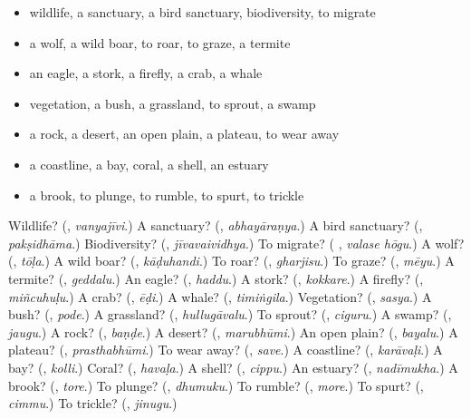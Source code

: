 \begin{itemize}
\raggedright
  \item wildlife, a sanctuary, a bird sanctuary, biodiversity, to migrate
  \item a wolf, a wild boar, to roar, to graze, a termite
  \item an eagle, a stork, a firefly, a crab, a whale
  \item vegetation, a bush, a grassland, to sprout, a swamp
  \item a rock, a desert, an open plain, a plateau, to wear away
  \item a coastline, a bay, coral, a shell, an estuary
  \item a brook, to plunge, to rumble, to spurt, to trickle
\end{itemize}

\begin{tcolorbox}[breakable,colback=teal!4,colframe=teal!35!black,title={Before you move on}]
Wildlife? (\textbf{}, \emph{vanyajīvi}.) A sanctuary? (\textbf{}, \emph{abhayāraṇya}.) A bird sanctuary? (\textbf{}, \emph{pakṣidhāma}.) Biodiversity? (\textbf{}, \emph{jīvavaividhya}.) To migrate? (\textbf{ }, \emph{valase hōgu}.) A wolf? (\textbf{}, \emph{tōḷa}.) A wild boar? (\textbf{}, \emph{kāḍuhandi}.) To roar? (\textbf{}, \emph{gharjisu}.) To graze? (\textbf{}, \emph{mēyu}.) A termite? (\textbf{}, \emph{geddalu}.) An eagle? (\textbf{}, \emph{haddu}.) A stork? (\textbf{}, \emph{kokkare}.) A firefly? (\textbf{}, \emph{miñcuhuḷu}.) A crab? (\textbf{}, \emph{ēḍi}.) A whale? (\textbf{}, \emph{timiṅgila}.) Vegetation? (\textbf{}, \emph{sasya}.) A bush? (\textbf{}, \emph{pode}.) A grassland? (\textbf{}, \emph{hullugāvalu}.) To sprout? (\textbf{}, \emph{ciguru}.) A swamp? (\textbf{}, \emph{jaugu}.) A rock? (\textbf{}, \emph{baṇḍe}.) A desert? (\textbf{}, \emph{marubhūmi}.) An open plain? (\textbf{}, \emph{bayalu}.) A plateau? (\textbf{}, \emph{prasthabhūmi}.) To wear away? (\textbf{}, \emph{save}.) A coastline? (\textbf{}, \emph{karāvaḷi}.) A bay? (\textbf{}, \emph{kolli}.) Coral? (\textbf{}, \emph{havaḷa}.) A shell? (\textbf{}, \emph{cippu}.) An estuary? (\textbf{}, \emph{nadīmukha}.) A brook? (\textbf{}, \emph{tore}.) To plunge? (\textbf{}, \emph{dhumuku}.) To rumble? (\textbf{}, \emph{more}.) To spurt? (\textbf{}, \emph{cimmu}.) To trickle? (\textbf{}, \emph{jinugu}.)
\end{tcolorbox}
